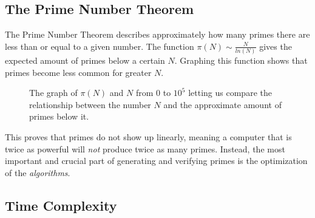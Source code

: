 \documentclass[main.tex]{subfiles}
\begin{document}
\subsection{The Prime Number Theorem}
The Prime Number Theorem \cite{theorem:prime_num} describes approximately how many primes there are less than or equal to a given number. The function $\pi(N) \sim \frac{N}{ln(N)}$ gives the expected amount of primes below a certain $N$. Graphing this function shows that primes become less common for greater $N$.

\begin{figure}[ht]
    \begin{center}
    \end{center}
\caption{The graph of $\pi(N)$ and $N$ from $0$ to $10^{5}$ letting us compare the relationship between the number $N$ and the approximate amount of primes below it.}
\end{figure}

This proves that primes do not show up linearly, meaning a computer that is twice as powerful will \textit{not} produce twice as many primes. Instead, the most important and crucial part of generating and verifying primes is the optimization of the \textit{algorithms}.

\subsection{Time Complexity}
\end{document}
